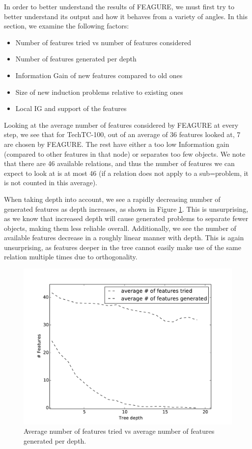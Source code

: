 \documentclass[twoside,11pt]{article}
\theoremstyle{definition}
\begin{document}
In order to better understand the results of FEAGURE, we must first try to better understand its output and how it behaves from a variety of angles.
In this section, we examine the following factors:
\begin{itemize}
	\item Number of features tried vs number of features considered
	\item Number of features generated per depth
	\item Information Gain of new features compared to old ones
	\item Size of new induction problems relative to existing ones
	\item Local IG and support of the features
\end{itemize}

Looking at the average number of features considered by FEAGURE at every step, we see that for TechTC-100, out of an average of 36 features looked at, 7 are chosen by FEAGURE. The rest have either a too low Information gain (compared to other features in that node) or separates too few objects.
We note that there are 46 available relations, and thus the number of features we can expect to look at is at most 46 (if a relation does not apply to a sub=problem, it is not counted in this average). %

When taking depth into account, we see a rapidly decreasing number of generated features as depth increases, as shown in Figure \ref{fig:features_per_depth}.
This is unsurprising, as we know that increased depth will cause generated problems to separate fewer objects, making them less reliable overall. Additionally, we see the number of available features decrease in a roughly linear manner with depth. This is again unsurprising, as features deeper in the tree cannot easily make use of the same relation multiple times due to orthogonality.

\begin{figure}
	\centering
	\includegraphics[width=0.8\linewidth]{features_per_depth}
	\caption{Average number of features tried vs average number of features generated per depth.}
	\label{fig:features_per_depth}
\end{figure}
\end{document}

